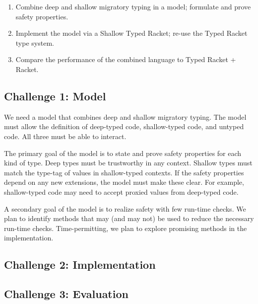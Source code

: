 \begin{enumerate}
\item Combine deep and shallow migratory typing in a model; formulate and prove safety properties.
\item Implement the model via a Shallow Typed Racket; re-use the Typed Racket type system.
\item Compare the performance of the combined language to Typed Racket + Racket.
\end{enumerate}

\subsection{Challenge 1: Model}

We need a model that combines deep and shallow migratory typing.
The model must allow the definition of deep-typed code, shallow-typed code, and untyped code.
All three must be able to interact.

The primary goal of the model is to state and prove safety properties for each kind of type.
Deep types must be trustworthy in any context.
Shallow types must match the type-tag of values in shallow-typed contexts.
If the safety properties depend on any new extensions, the model must make these clear.
For example, shallow-typed code may need to accept proxied values from deep-typed code.


A secondary goal of the model is to realize safety with few run-time checks.
We plan to identify methods that may (and may not) be used to reduce the necessary run-time checks.
Time-permitting, we plan to explore promising methods in the implementation.


\subsection{Challenge 2: Implementation}




\subsection{Challenge 3: Evaluation}


